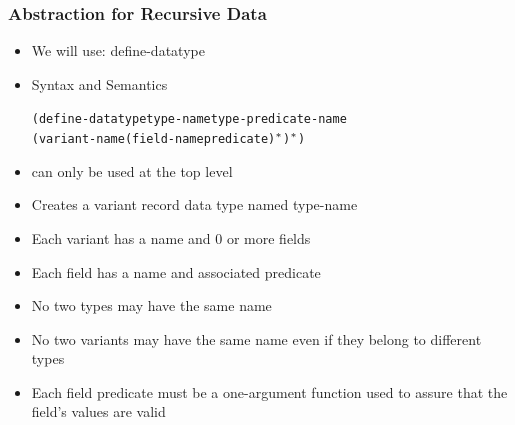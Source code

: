 \documentclass{beamer}
\begin{document}
\begin{frame}[fragile]
\frametitle{Abstraction for Recursive Data}
\begin{scriptsize}
\begin{itemize}
\item<1-> We will use: define-datatype

\item<2-> Syntax and Semantics
\begin{alltt}
(define-datatype type-name type-predicate-name
  {(variant-name { (field-name predicate)}\(\sp{*}\))}\(\sp{*}\))
\end{alltt}

\item<2-> can only be used at the top level

\item<2-> Creates a variant record data type named type-name

\item<2-> Each variant has a name and 0 or more fields

\item<2-> Each field has a name and associated predicate

\item<2-> No two types may have the same name

\item<2-> No two variants may have the same name even if they belong to different types

\item<2-> Each field predicate must be a one-argument function used to assure that the field’s values are valid

\end{itemize}
\end{scriptsize}
\end{frame}
\end{document}
